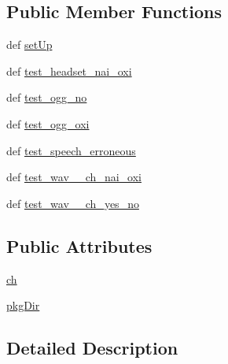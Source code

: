 \subsection*{Public Member Functions}
\begin{DoxyCompactItemize}
\item 
def \hyperlink{classspeech__detection__sphinx__tests_1_1SpeechDetectionSphinxTests_aa41c002f4e23ed7ce1c1e882b56046b1}{set\-Up}
\item 
def \hyperlink{classspeech__detection__sphinx__tests_1_1SpeechDetectionSphinxTests_afbc56e6bf7cc90398c80b991ad13cf9b}{test\-\_\-headset\-\_\-nai\-\_\-oxi}
\item 
def \hyperlink{classspeech__detection__sphinx__tests_1_1SpeechDetectionSphinxTests_ab6133d37d8d0028e46766a876acfb79a}{test\-\_\-ogg\-\_\-no}
\item 
def \hyperlink{classspeech__detection__sphinx__tests_1_1SpeechDetectionSphinxTests_ac8683a420147b66c48129fa35eb753f5}{test\-\_\-ogg\-\_\-oxi}
\item 
def \hyperlink{classspeech__detection__sphinx__tests_1_1SpeechDetectionSphinxTests_ad93f126c24a5ab825024c6a05c93e93c}{test\-\_\-speech\-\_\-erroneous}
\item 
def \hyperlink{classspeech__detection__sphinx__tests_1_1SpeechDetectionSphinxTests_a5d0a4b4ece4394da690f8919a81fc985}{test\-\_\-wav\-\_\-\_\-ch\-\_\-nai\-\_\-oxi}
\item 
def \hyperlink{classspeech__detection__sphinx__tests_1_1SpeechDetectionSphinxTests_a4c03976744f5e961265af9063cda9f0c}{test\-\_\-wav\-\_\-\_\-ch\-\_\-yes\-\_\-no}
\end{DoxyCompactItemize}
\subsection*{Public Attributes}
\begin{DoxyCompactItemize}
\item 
\hyperlink{classspeech__detection__sphinx__tests_1_1SpeechDetectionSphinxTests_ac7ee63ac6abc6d7c42dfe78f1982c480}{ch}
\item 
\hyperlink{classspeech__detection__sphinx__tests_1_1SpeechDetectionSphinxTests_afd1a45b07c623d2a3ac4d5e393feecda}{pkg\-Dir}
\end{DoxyCompactItemize}


\subsection{Detailed Description}


